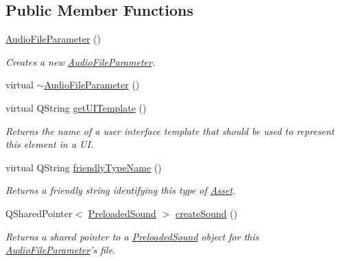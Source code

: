 \subsection*{Public Member Functions}
\begin{DoxyCompactItemize}
\item 
\hyperlink{class_picto_1_1_audio_file_parameter_ad284bcc428087050eed52edf9acf1764}{Audio\-File\-Parameter} ()
\begin{DoxyCompactList}\small\item\em Creates a new \hyperlink{class_picto_1_1_audio_file_parameter}{Audio\-File\-Parameter}. \end{DoxyCompactList}\item 
virtual \hyperlink{class_picto_1_1_audio_file_parameter_a4a2855d0e5ba65d82fea4539ea6ed42e}{$\sim$\-Audio\-File\-Parameter} ()
\item 
\hypertarget{class_picto_1_1_audio_file_parameter_a596e8a7ba161ff9f09cb81a94d73dd39}{virtual Q\-String \hyperlink{class_picto_1_1_audio_file_parameter_a596e8a7ba161ff9f09cb81a94d73dd39}{get\-U\-I\-Template} ()}\label{class_picto_1_1_audio_file_parameter_a596e8a7ba161ff9f09cb81a94d73dd39}

\begin{DoxyCompactList}\small\item\em Returns the name of a user interface template that should be used to represent this element in a U\-I. \end{DoxyCompactList}\item 
virtual Q\-String \hyperlink{class_picto_1_1_audio_file_parameter_ad13096076295bbd9e81d62401643eb63}{friendly\-Type\-Name} ()
\begin{DoxyCompactList}\small\item\em Returns a friendly string identifying this type of \hyperlink{class_picto_1_1_asset}{Asset}. \end{DoxyCompactList}\item 
Q\-Shared\-Pointer$<$ \hyperlink{class_picto_1_1_preloaded_sound}{Preloaded\-Sound} $>$ \hyperlink{class_picto_1_1_audio_file_parameter_a1628a85040b6f01dacaa5420453bae79}{create\-Sound} ()
\begin{DoxyCompactList}\small\item\em Returns a shared pointer to a \hyperlink{class_picto_1_1_preloaded_sound}{Preloaded\-Sound} object for this \hyperlink{class_picto_1_1_audio_file_parameter}{Audio\-File\-Parameter}'s file. \end{DoxyCompactList}\end{DoxyCompactItemize}
